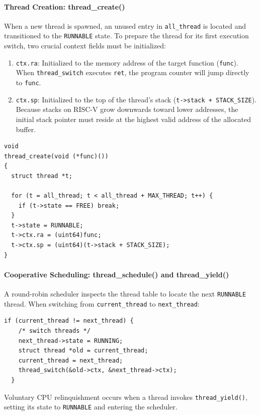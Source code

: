 \documentclass{labreport}
\begin{document}
\paragraph{Thread Creation: thread\_create()}
When a new thread is spawned, an unused entry in \texttt{all\_thread} is located and transitioned to the \texttt{RUNNABLE} state. To prepare the thread for its first execution switch, two crucial context fields must be initialized:
\begin{enumerate}[noitemsep]
    \item \texttt{ctx.ra}: Initialized to the memory address of the target function (\texttt{func}). When \texttt{thread\_switch} executes \texttt{ret}, the program counter will jump directly to \texttt{func}.
    \item \texttt{ctx.sp}: Initialized to the top of the thread's stack (\texttt{t->stack + STACK\_SIZE}). Because stacks on RISC-V grow downwards toward lower addresses, the initial stack pointer must reside at the highest valid address of the allocated buffer.
\end{enumerate}

\begin{lstlisting}[style=c]
void
thread_create(void (*func)())
{
  struct thread *t;

  for (t = all_thread; t < all_thread + MAX_THREAD; t++) {
    if (t->state == FREE) break;
  }
  t->state = RUNNABLE;
  t->ctx.ra = (uint64)func;
  t->ctx.sp = (uint64)(t->stack + STACK_SIZE);
}
\end{lstlisting}

\paragraph{Cooperative Scheduling: thread\_schedule() and thread\_yield()}
A round-robin scheduler inspects the thread table to locate the next \texttt{RUNNABLE} thread. When switching from \texttt{current\_thread} to \texttt{next\_thread}:
\begin{lstlisting}[style=c]
  if (current_thread != next_thread) {
    /* switch threads */
    next_thread->state = RUNNING;
    struct thread *old = current_thread;
    current_thread = next_thread;
    thread_switch(&old->ctx, &next_thread->ctx);
  }
\end{lstlisting}

Voluntary CPU relinquishment occurs when a thread invokes \texttt{thread\_yield()}, setting its state to \texttt{RUNNABLE} and entering the scheduler.
\end{document}
